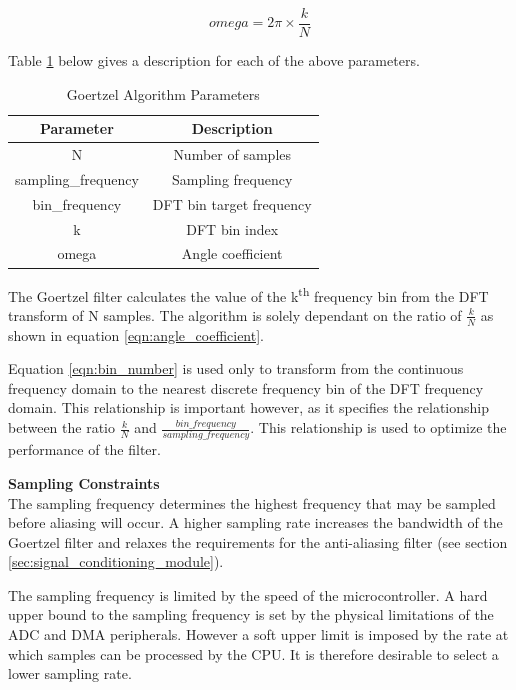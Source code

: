 \begin{equation}
omega = 2\pi \times \frac{k}{N}
\label{eqn:angle_coefficient}
\end{equation}

Table \ref{tbl:goertzel_algorithm_parameters} below gives a description for each of the above parameters.

\begin{table}[H]
	\centering
	\begin{tabular}{cc}
		\hline
		\textbf{Parameter} & \textbf{Description} \\ \hline
		N & Number of samples \\ \hline
		sampling\_frequency & Sampling frequency \\ \hline
		bin\_frequency & DFT bin target frequency \\ \hline
		k & DFT bin index \\ \hline
		omega & Angle coefficient \\ \hline
	\end{tabular}
	\caption{Goertzel Algorithm Parameters}
	\label{tbl:goertzel_algorithm_parameters}
\end{table}

The Goertzel filter calculates the value of the k\textsuperscript{th} frequency bin from the DFT transform of N samples. The algorithm is solely dependant on the ratio of $\frac{k}{N}$ as shown in equation \ref{eqn:angle_coefficient}.

Equation \ref{eqn:bin_number} is used only to transform from the continuous frequency domain to the nearest discrete frequency bin of the DFT frequency domain. This relationship is important however, as it specifies the relationship between the ratio $\frac{k}{N}$ and $\frac{bin\_frequency}{sampling\_frequency}$. This relationship is used to optimize the performance of the filter.


\textbf{Sampling Constraints}\\
\label{sec:sampling_frequency_constraints}
The sampling frequency determines the highest frequency that may be sampled before aliasing will occur. A higher sampling rate increases the bandwidth of the Goertzel filter and relaxes the requirements for the anti-aliasing filter (see section \ref{sec:signal_conditioning_module}).

The sampling frequency is limited by the speed of the microcontroller. A hard upper bound to the sampling frequency is set by the physical limitations of the ADC and DMA peripherals. However a soft upper limit is imposed by the rate at which samples can be processed by the CPU. It is therefore desirable to select a lower sampling rate.

